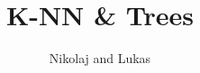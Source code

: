 \documentclass[12pt,a4paper]{beamer}
\begin{document}
\begin{frame}
\author{Nikolaj and Lukas}
\title{K-NN \& Trees}
\maketitle
\end{frame}

\centering










\end{document}
